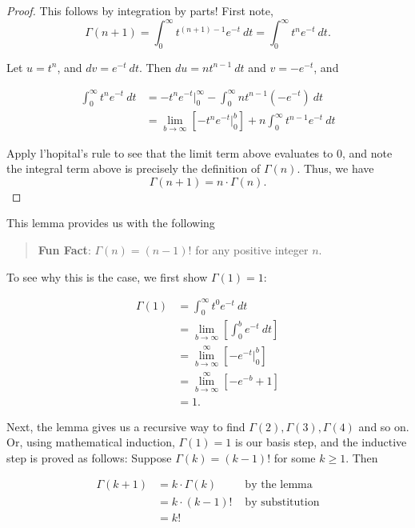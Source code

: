 \documentclass[
]{book}
\theoremstyle{definition}
\theoremstyle{definition}
\theoremstyle{definition}
\theoremstyle{definition}
\theoremstyle{remark}
\begin{document}
\begin{proof}
This follows by integration by parts!
First note,
\[
\Gamma(n+1) = \int_0^\infty t^{(n+1)-1}e^{-t}~dt = \int_0^\infty t^n e^{-t}~dt.
\]

Let \(u = t^n\), and \(dv = e^{-t}~dt\). Then \(du = nt^{n-1}~dt\) and \(v = -e^{-t}\), and

\begin{align*}
\int_0^\infty t^n e^{-t}~dt &= -t^ne^{-t}\biggr|_0^\infty - \int_0^\infty nt^{n-1}(-e^{-t})~dt \\
      &= \lim_{b \to \infty}\left[-t^ne^{-t}\biggr|_0^b\right]+n\int_0^\infty t^{n-1}e^{-t}~dt
\end{align*}

Apply l'hopital's rule to see that the limit term above evaluates to 0, and note the integral term above is precisely the definition of \(\Gamma(n)\).
Thus, we have
\[ \Gamma(n+1) = n \cdot \Gamma(n).\]
\end{proof}

This lemma provides us with the following

\begin{quote}
\textbf{Fun Fact}:
\(\Gamma(n) = (n-1)!\) for any positive integer \(n\).
\end{quote}

To see why this is the case, we first show \(\Gamma(1) = 1\):

\begin{align*}
\Gamma(1) &= \int_0^\infty t^0e^{-t}~dt\\
          &= \lim_{b\to\infty}\left[\int_0^b e^{-t}~dt\right]\\
          &= \lim_{b\to\infty}^\infty\left[-e^{-t}\biggr|_0^b\right]\\
          &= \lim_{b\to\infty}^\infty\left[-e^{-b}+1\right]\\
          &= 1.
\end{align*}

Next, the lemma gives us a recursive way to find
\(\Gamma(2), \Gamma(3), \Gamma(4)\) and so on. Or, using mathematical induction, \(\Gamma(1) = 1\) is our basis step, and the inductive step is proved as follows:
Suppose \(\Gamma(k) = (k-1)!\) for some \(k \geq 1\). Then

\begin{align*}
\Gamma(k+1) &= k\cdot \Gamma(k) &\text{ by the lemma }\\
            &= k \cdot (k-1)! &\text{ by substitution}\\
            &= k!
\end{align*}
\end{document}

